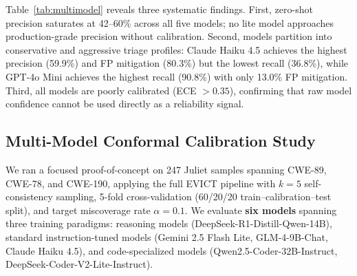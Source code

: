 \begin{table}[t]
\centering
\caption{Multi-model zero-shot baseline on the Juliet benchmark (aggregated over 87+ CWE classes, $k{=}1$). Precision, recall, and ECE are computed on the accepted set; Coverage is the fraction of all alerts that received a TP or FP decision; FP Mitigation is the fraction of ground-truth FP alerts correctly rejected.}
\label{tab:multimodel}
\small
\setlength{\tabcolsep}{5pt}
\end{table}

Table~\ref{tab:multimodel} reveals three systematic findings. First, zero-shot precision saturates at 42--60\% across all five models; no lite model approaches production-grade precision without calibration. Second, models partition into conservative and aggressive triage profiles: Claude Haiku 4.5 achieves the highest precision (59.9\%) and FP mitigation (80.3\%) but the lowest recall (36.8\%), while GPT-4o Mini achieves the highest recall (90.8\%) with only 13.0\% FP mitigation. Third, all models are poorly calibrated (ECE $> 0.35$), confirming that raw model confidence cannot be used directly as a reliability signal.

\subsection{Multi-Model Conformal Calibration Study}
\label{sec:conformal_study}

We ran a focused proof-of-concept on 247 Juliet samples spanning CWE-89, CWE-78, and CWE-190, applying the full EVICT pipeline with $k=5$ self-consistency sampling, 5-fold cross-validation (60/20/20 train--calibration--test split), and target miscoverage rate $\alpha = 0.1$. We evaluate \textbf{six models} spanning three training paradigms: reasoning models (DeepSeek-R1-Distill-Qwen-14B), standard instruction-tuned models (Gemini 2.5 Flash Lite, GLM-4-9B-Chat, Claude Haiku 4.5), and code-specialized models (Qwen2.5-Coder-32B-Instruct, DeepSeek-Coder-V2-Lite-Instruct).

